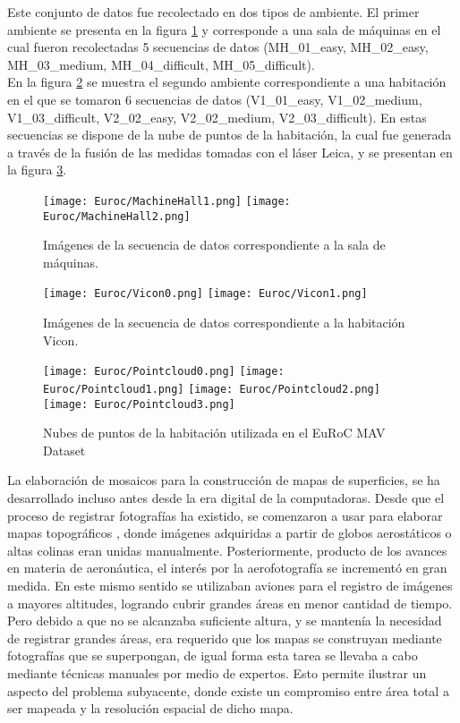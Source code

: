 Este conjunto de datos fue recolectado en dos tipos de ambiente. El primer ambiente se presenta en la figura \ref{fig:machineHall} y  corresponde a una sala de máquinas en el cual fueron recolectadas 5 secuencias de datos (MH\_01\_easy, MH\_02\_easy, MH\_03\_medium, MH\_04\_difficult, MH\_05\_difficult). \\

En la figura \ref{fig:vicon} se muestra el segundo ambiente correspondiente a una habitación en el que se tomaron 6 secuencias de datos (V1\_01\_easy, V1\_02\_medium, V1\_03\_difficult, V2\_02\_easy, V2\_02\_medium, V2\_03\_difficult). En estas secuencias se dispone de la nube de puntos de la habitación, la cual fue generada a través de la fusión de las medidas tomadas con el láser Leica, y se presentan en la figura \ref{fig:pointcloudEuroc}.\\

\begin{figure}[H]
	\centering
	\texttt{[image: Euroc/MachineHall1.png]}
	\texttt{[image: Euroc/MachineHall2.png]}
	\caption{Imágenes de la secuencia de datos correspondiente a la sala de máquinas.}
	\label{fig:machineHall}
\end{figure}


\begin{figure}[H]
	\centering
	\texttt{[image: Euroc/Vicon0.png]}
	\texttt{[image: Euroc/Vicon1.png]}
	\caption{Imágenes de la secuencia de datos correspondiente a la habitación Vicon.}
	\label{fig:vicon}
\end{figure}


\begin{figure}[H]
	\centering
	\texttt{[image: Euroc/Pointcloud0.png]}
	\texttt{[image: Euroc/Pointcloud1.png]}
	\texttt{[image: Euroc/Pointcloud2.png]}
	\texttt{[image: Euroc/Pointcloud3.png]}
	\caption{Nubes de puntos de la habitación utilizada en el EuRoC MAV Dataset}
	\label{fig:pointcloudEuroc}
\end{figure}


La elaboración de mosaicos para la construcción de mapas de superficies, se ha desarrollado incluso antes desde la era digital de la computadoras. Desde que el proceso de registrar fotografías ha existido, se comenzaron a usar para elaborar mapas topográficos \cite{primeros-mapas}, donde imágenes adquiridas a partir de globos aerostáticos o altas colinas eran unidas manualmente. Posteriormente, producto de los avances en materia de aeronáutica, el interés por la aerofotografía se incrementó en gran medida. En este mismo sentido se utilizaban aviones para el registro de imágenes a mayores altitudes, logrando cubrir grandes áreas en menor cantidad de tiempo. Pero debido a que no se alcanzaba suficiente altura, y se mantenía la necesidad de registrar grandes áreas, era requerido que los mapas se construyan mediante fotografías que se superpongan, de igual forma esta tarea se llevaba a cabo mediante técnicas manuales por medio de expertos. Esto permite ilustrar un aspecto del problema subyacente, donde existe un compromiso entre área total a ser mapeada y la resolución espacial de dicho mapa.

